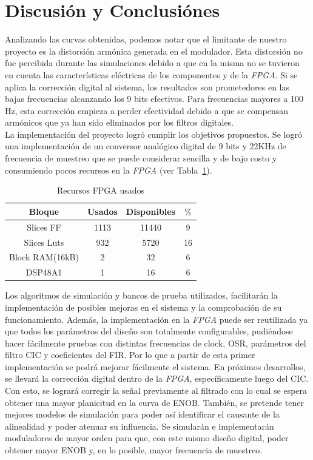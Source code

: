 \documentclass[a4paper,conference]{IEEEtran}
\begin{document}
\section{Discusión y Conclusi\'ones}
Analizando las curvas obtenidas, podemos notar que el limitante de nuestro proyecto es la distorsión armónica generada en el modulador. Esta distorsión no fue percibida durante las simulaciones debido a que en la misma no se tuvieron en cuenta las características eléctricas de los componentes y de la \textit{FPGA}. Si se aplica la corrección digital al sistema, los resultados son prometedores en las bajas frecuencias alcanzando los 9 bits efectivos. Para frecuencias mayores a 100 Hz, esta corrección empieza a perder efectividad debido a que se compensan armónicos que ya han sido eliminados por los filtros digitales.\\
La implementación del proyecto logr\'o cumplir los objetivos propuestos. Se logr\'o una implementaci\'on de un conversor analógico digital de 9 bits y 22KHz de frecuencia de muestreo que se puede considerar sencilla y de bajo costo y consumiendo pocos recursos en la \textit{FPGA} (ver Tabla~\ref{Tabla:rescursos}). 
\begin{table}[!t]
	\renewcommand{\arraystretch}{1.3}
	\caption{Recursos FPGA usados}
	\label{Tabla:rescursos}
	\centering
	\begin{tabular}{|c|c|c|c|}
		\hline
		Bloque & Usados & Disponibles & $\%$ \\
		\hline
		Slices FF & 1113 & 11440 & 9\\
		\hline
		Slices Luts & 932 & 5720 & 16\\
		\hline
		Block RAM(16kB) & 2 & 32 & 6\\
		\hline
		DSP48A1 & 1 & 16 & 6\\
		\hline
	\end{tabular}
\end{table}
Los algoritmos de simulaci\'on y bancos de prueba utilizados, facilitarán la implementaci\'on de posibles mejoras en el sistema y la comprobación de su funcionamiento. Además, la implementación en la \textit{FPGA} puede ser reutilizada ya que todos los parámetros del diseño son totalmente configurables, pudiéndose hacer fácilmente pruebas con distintas frecuencias de clock, OSR, parámetros del filtro CIC y coeficientes del FIR. Por lo que a partir de esta primer implementaci\'on se podrá mejorar fácilmente el sistema.
 En próximos desarrollos, se llevará  la corrección digital dentro de la \textit{FPGA}, específicamente luego del CIC. Con esto, se logrará corregir la señal previamente al filtrado con lo cual se espera obtener una mayor planicitud en la curva de ENOB. También, se pretende tener mejores modelos de simulación para poder así identificar el causante de la alinealidad y poder atenuar su influencia. Se simularán e implementarán moduladores de mayor orden para que, con este mismo diseño digital, poder obtener mayor ENOB y, en lo posible, mayor frecuencia de muestreo.  
\end{document}
